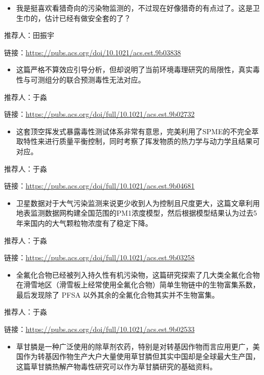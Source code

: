 \documentclass[
]{book}
\providecommand{\tightlist}{%
  \setlength{\itemsep}{0pt}\setlength{\parskip}{0pt}}
\begin{document}
\begin{itemize}
\tightlist
\item
  我是挺喜欢看猎奇向的污染物监测的，不过现在好像猎奇的有点过了。这是卫生巾的，估计已经有做安全套的了？
\end{itemize}

推荐人：田振宇

链接：\url{https://pubs.acs.org/doi/10.1021/acs.est.9b03838}

\begin{itemize}
\tightlist
\item
  这篇严格不算效应引导分析，但却说明了当前环境毒理研究的局限性，真实毒性与可测组分的联合预测毒性无法对应。
\end{itemize}

推荐人：于淼

链接：\url{https://pubs.acs.org/doi/full/10.1021/acs.est.9b02732}

\begin{itemize}
\tightlist
\item
  这套顶空挥发式暴露毒性测试体系非常有意思，完美利用了SPME的不完全萃取特性来进行质量平衡控制，同时考察了挥发物质的热力学与动力学且结果可对应。
\end{itemize}

推荐人：于淼

链接：\url{https://pubs.acs.org/doi/full/10.1021/acs.est.9b04681}

\begin{itemize}
\tightlist
\item
  卫星数据对于大气污染监测来说更少收到人为控制且尺度更大，这篇文章利用地表监测数据网构建全国范围的PM1浓度模型，然后根据模型结果认为过去5年来国内的大气颗粒物浓度有了稳定下降。
\end{itemize}

推荐人：于淼

链接：\url{https://pubs.acs.org/doi/full/10.1021/acs.est.9b03258}

\begin{itemize}
\tightlist
\item
  全氟化合物已经被列入持久性有机污染物，这篇研究探索了几大类全氟化合物在滑雪地区（滑雪板上经常使用全氟化合物）简单生物链中的生物富集系数，最后发现除了 PFSA 以外其余的全氟化合物其实并不生物富集。
\end{itemize}

推荐人：于淼

链接：\url{https://pubs.acs.org/doi/full/10.1021/acs.est.9b02533}

\begin{itemize}
\tightlist
\item
  草甘膦是一种广泛使用的除草剂农药，特别是对转基因作物而言应用更广，美国作为转基因作物生产大户大量使用草甘膦但其实中国却是全球最大生产国，这篇草甘膦热解产物毒性研究可以作为草甘膦研究的基础资料。
\end{itemize}
\end{document}
